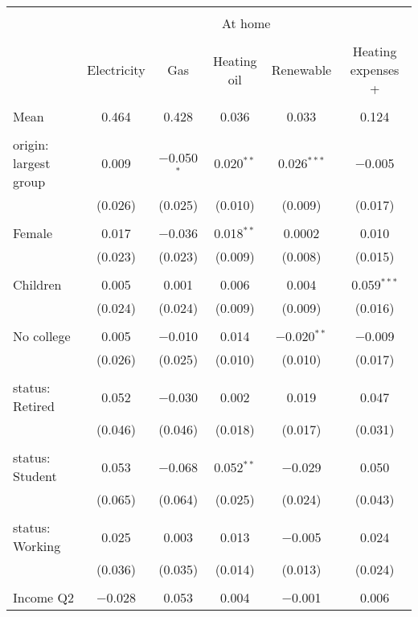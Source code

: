 
\begin{tabular}{@{\extracolsep{5pt}}lccccc} 
\\[-1.8ex]\hline 
\hline \\[-1.8ex] 
 & \multicolumn{5}{c}{At home} \\ 
\cline{2-6} 
\\[-1.8ex] & Electricity & Gas & Heating oil & Renewable & Heating expenses \textdollar 200+ \\ 
\hline \\[-1.8ex] 
 Mean & 0.464 & 0.428 & 0.036 & 0.033 & 0.124  \\ \hline \\[-1.8ex] origin: largest group & 0.009 & $-$0.050$^{*}$ & 0.020$^{**}$ & 0.026$^{***}$ & $-$0.005 \\ 
  & (0.026) & (0.025) & (0.010) & (0.009) & (0.017) \\ 
  & & & & & \\ 
 Female & 0.017 & $-$0.036 & 0.018$^{**}$ & 0.0002 & 0.010 \\ 
  & (0.023) & (0.023) & (0.009) & (0.008) & (0.015) \\ 
  & & & & & \\ 
 Children & 0.005 & 0.001 & 0.006 & 0.004 & 0.059$^{***}$ \\ 
  & (0.024) & (0.024) & (0.009) & (0.009) & (0.016) \\ 
  & & & & & \\ 
 No college & 0.005 & $-$0.010 & 0.014 & $-$0.020$^{**}$ & $-$0.009 \\ 
  & (0.026) & (0.025) & (0.010) & (0.010) & (0.017) \\ 
  & & & & & \\ 
 status: Retired & 0.052 & $-$0.030 & 0.002 & 0.019 & 0.047 \\ 
  & (0.046) & (0.046) & (0.018) & (0.017) & (0.031) \\ 
  & & & & & \\ 
 status: Student & 0.053 & $-$0.068 & 0.052$^{**}$ & $-$0.029 & 0.050 \\ 
  & (0.065) & (0.064) & (0.025) & (0.024) & (0.043) \\ 
  & & & & & \\ 
 status: Working & 0.025 & 0.003 & 0.013 & $-$0.005 & 0.024 \\ 
  & (0.036) & (0.035) & (0.014) & (0.013) & (0.024) \\ 
  & & & & & \\ 
 Income Q2 & $-$0.028 & 0.053 & 0.004 & $-$0.001 & 0.006 \\ 

\end{tabular}
